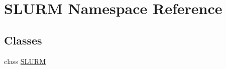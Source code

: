 \hypertarget{namespace_s_l_u_r_m}{\section{S\-L\-U\-R\-M Namespace Reference}
\label{namespace_s_l_u_r_m}
}
\subsection*{Classes}
\begin{DoxyCompactItemize}
\item 
class \hyperlink{class_s_l_u_r_m_1_1_s_l_u_r_m}{S\-L\-U\-R\-M}
\end{DoxyCompactItemize}
